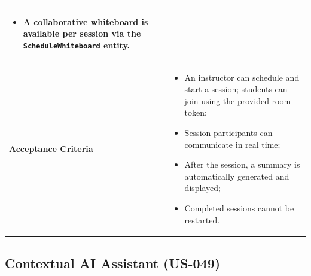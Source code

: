 \begin{table}[H]
\begin{tabularx}{\textwidth}{|p{3.5cm}|X|}
\begin{itemize}[noitemsep, topsep=2pt]
  \item A collaborative whiteboard is available per session via the
        \texttt{ScheduleWhiteboard} entity.
\end{itemize} \\
\hline
\textbf{Acceptance Criteria} &
\begin{itemize}[noitemsep, topsep=2pt]
  \item An instructor can schedule and start a session; students can join using the
        provided room token;
  \item Session participants can communicate in real time;
  \item After the session, a summary is automatically generated and displayed;
  \item Completed sessions cannot be restarted.
\end{itemize} \\
\hline
\end{tabularx}
\end{table}

\subsection{Contextual AI Assistant (US-049)}

